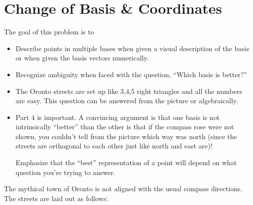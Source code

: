 \section*{Change of Basis \& Coordinates}

	\question
	\begin{annotation}
		\begin{goals}

			The goal of this problem is to
			\begin{itemize}
				\item Describe points in multiple bases when given a visual description of the basis
					or when given the basis vectors numerically.
				\item Recognize ambiguity when faced with the question, ``Which basis is better?''
			\end{itemize}
		\end{goals}

		\begin{notes}
			\begin{itemize}
				\item The Oronto streets are set up like 3,4,5 right triangles and all the numbers are easy.
					This question can be answered from the picture or algebraically.
				\item Part 4 is important. A convincing argument is that one basis is not intrinsically
					``better'' than the other is that if the compass rose were
					not shown, you couldn't tell from the picture which way was north (since the streets are orthogonal
					to each other just like north and east are)!

					Emphasize that the ``best'' representation of a point will depend on what
					question you're trying to answer.
			\end{itemize}
		\end{notes}
	\end{annotation}
	The mythical town of Oronto is not aligned with the usual
	compass directions. The streets are laid out as follows:

